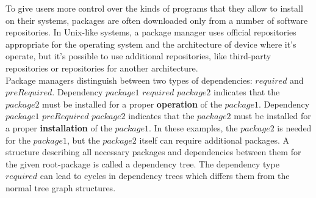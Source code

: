 To give users more control over the kinds of programs that they allow to install on their systems, packages are often downloaded only from a number of software repositories.
In Unix-like systems, a package manager uses official repositories appropriate for the operating system and the architecture  of device where it's operate, but it's possible to use additional repositories, like third-party repositories or repositories for another architecture.\\
Package managers distinguish between two types of dependencies: $required$ and $preRequired$. %
Dependency $package1$ \textbf{$required$} $package2$ indicates that the $package2$ must be installed for a proper \textbf{operation} of the $package1$. %
Dependency $package1$ \textbf{$preRequired$} $package2$ indicates that the $package2$ must be installed for a proper \textbf{installation} of the $package1$. %
In these examples, the $package2$ is needed for the $package1$, but the $package2$ itself can require additional packages.
A structure describing all necessary packages and dependencies between them for the given root-package is called a dependency tree. 
The dependency type $required$ can lead to cycles in dependency trees which differs them from the normal tree graph structures.
